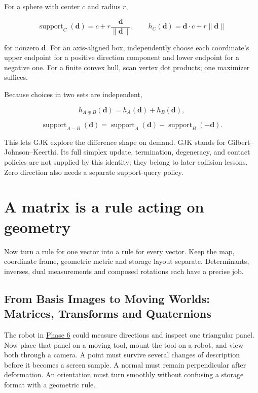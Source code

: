 For a sphere with center \(c\) and radius \(r\),

\[
\operatorname{support}_C(\mathbf d)=c+r\frac{\mathbf d}{\|\mathbf d\|},
\qquad h_C(\mathbf d)=\mathbf d\cdot c+r\|\mathbf d\|
\]

for nonzero \(\mathbf d\). For an axis-aligned box, independently choose each coordinate's upper endpoint for a positive direction component and lower endpoint for a negative one. For a finite convex hull, scan vertex dot products; one maximizer suffices.

Because choices in two sets are independent,

\[
h_{A\oplus B}(\mathbf d)=h_A(\mathbf d)+h_B(\mathbf d),
\]

\[
\operatorname{support}_{A-B}(\mathbf d)
=\operatorname{support}_A(\mathbf d)-\operatorname{support}_B(-\mathbf d).
\]

This lets GJK explore the difference shape on demand. GJK stands for Gilbert--Johnson--Keerthi. Its full simplex update, termination, degeneracy, and contact policies are not supplied by this identity; they belong to later collision lessons. Zero direction also needs a separate support-query policy.

\chapter{A matrix is a rule acting on geometry}\label{01-foundations-i-ch018-a-matrix-is-a-rule-acting-on-geometry}

Now turn a rule for one vector into a rule for every vector. Keep the map, coordinate frame, geometric metric and storage layout separate. Determinants, inverses, dual measurements and composed rotations each have a precise job.

\section{From Basis Images to Moving Worlds: Matrices, Transforms and Quaternions}\label{01-foundations-i-ch018-from-basis-images-to-moving-worlds-matrices-transforms-and-quaternions}

The robot in \hyperref[01-foundations-i-ch017-the-panel-gives-us-a-reason-to-learn]{Phase 6} could measure directions and inspect one triangular panel. Now place that panel on a moving tool, mount the tool on a robot, and view both through a camera. A point must survive several changes of description before it becomes a screen sample. A normal must remain perpendicular after deformation. An orientation must turn smoothly without confusing a storage format with a geometric rule.

